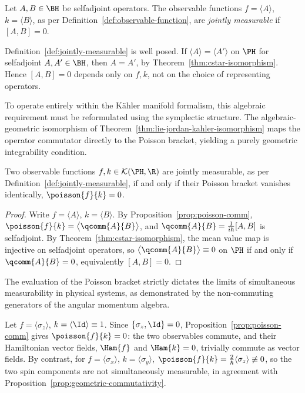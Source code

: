\begin{definition}
	\label{def:jointly-measurable}
	Let $A,B\in\BH$ be selfadjoint operators. The observable functions $f=\langle A\rangle$, $k=\langle B\rangle$, as per Definition~\ref{def:observable-function}, are \emph{jointly measurable} if $[A,B]=0$.
\end{definition}

\begin{remark}
	Definition~\ref{def:jointly-measurable} is well posed. If $\langle A\rangle=\langle A'\rangle$ on $\PH$ for selfadjoint $A,A'\in\BH$, then $A=A'$, by Theorem~\ref{thm:cstar-isomorphism}. Hence $[A,B]=0$ depends only on $f,k$, not on the choice of representing operators.
\end{remark}

To operate entirely within the Kähler manifold formalism, this algebraic requirement must be reformulated using the symplectic structure. The algebraic-geometric isomorphism of Theorem~\ref{thm:lie-jordan-kahler-isomorphism} maps the operator commutator directly to the Poisson bracket, yielding a purely geometric integrability condition.

\begin{proposition}
	\label{prop:geometric-commutativity}
	Two observable functions $f,k\in\mathcal K(\PH,\R)$ are jointly measurable, as per Definition~\ref{def:jointly-measurable}, if and only if their Poisson bracket vanishes identically, $\poisson{f}{k}=0$.
\end{proposition}

\begin{proof}
	Write $f=\langle A\rangle$, $k=\langle B\rangle$. By
	Proposition~\ref{prop:poisson-comm}, $\poisson{f}{k}=\big\langle\qcomm{A}{B}\big\rangle$, and $\qcomm{A}{B}=\tfrac{1}{i\hbar}[A,B]$ is selfadjoint. By Theorem~\ref{thm:cstar-isomorphism}, the mean value map is injective on selfadjoint operators, so $\big\langle\qcomm{A}{B}\big\rangle\equiv0$ on $\PH$ if and only if $\qcomm{A}{B}=0$, equivalently $[A,B]=0$.
\end{proof}

The evaluation of the Poisson bracket strictly dictates the limits of simultaneous measurability in physical systems, as demonstrated by the non-commuting generators of the angular momentum algebra.

\begin{example}
	Let $f=\langle\sigma_z\rangle$, $k=\langle\Id\rangle\equiv1$. Since
	$\{\sigma_z,\Id\}=0$, Proposition~\ref{prop:poisson-comm} gives
	$\poisson{f}{k}=0$: the two observables commute, and their Hamiltonian
	vector fields, $\Ham{f}$ and $\Ham{k}=0$, trivially commute as vector
	fields. By contrast, for $f=\langle\sigma_x\rangle$, $k=\langle\sigma_y\rangle$,
	$\poisson{f}{k}=\tfrac{2}{\hbar}\langle\sigma_z\rangle\not\equiv0$, so
	the two spin components are not simultaneously measurable, in agreement
	with Proposition~\ref{prop:geometric-commutativity}.
\end{example} 